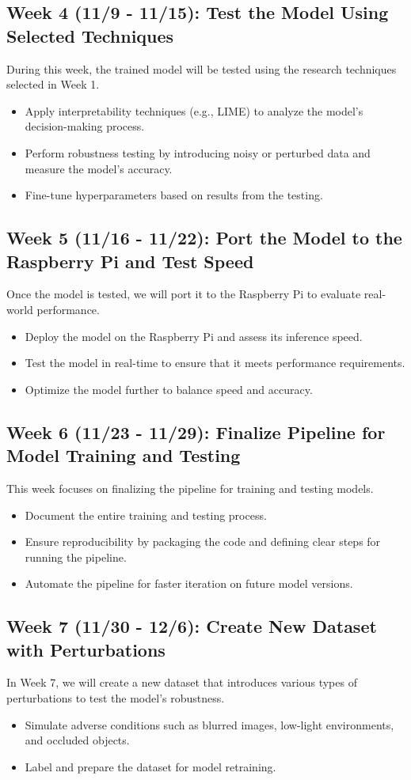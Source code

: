 \subsection*{Week 4 (11/9 - 11/15): Test the Model Using Selected Techniques}
During this week, the trained model will be tested using the research techniques selected in Week 1.
\begin{itemize}
    \item Apply interpretability techniques (e.g., LIME) to analyze the model's decision-making process.
    \item Perform robustness testing by introducing noisy or perturbed data and measure the model's accuracy.
    \item Fine-tune hyperparameters based on results from the testing.
\end{itemize}

\subsection*{Week 5 (11/16 - 11/22): Port the Model to the Raspberry Pi and Test Speed}
Once the model is tested, we will port it to the Raspberry Pi to evaluate real-world performance.
\begin{itemize}
    \item Deploy the model on the Raspberry Pi and assess its inference speed.
    \item Test the model in real-time to ensure that it meets performance requirements.
    \item Optimize the model further to balance speed and accuracy.
\end{itemize}

\subsection*{Week 6 (11/23 - 11/29): Finalize Pipeline for Model Training and Testing}
This week focuses on finalizing the pipeline for training and testing models.
\begin{itemize}
    \item Document the entire training and testing process.
    \item Ensure reproducibility by packaging the code and defining clear steps for running the pipeline.
    \item Automate the pipeline for faster iteration on future model versions.
\end{itemize}

\subsection*{Week 7 (11/30 - 12/6): Create New Dataset with Perturbations}
In Week 7, we will create a new dataset that introduces various types of perturbations to test the model's robustness.
\begin{itemize}
    \item Simulate adverse conditions such as blurred images, low-light environments, and occluded objects.
    \item Label and prepare the dataset for model retraining.
\end{itemize}

